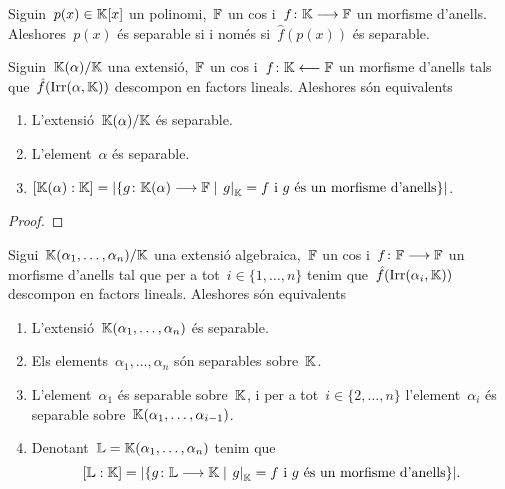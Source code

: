 \documentclass[../../Main.tex]{subfiles}
\begin{document}
	\begin{lemma}
		\label{lema:un polinomi és separable si i només si ho és adaptant els coeficients}
		Siguin~\(p(x)\in\mathbb{K}[x]\) un polinomi,~\(\mathbb{F}\) un cos i~\(f\colon\mathbb{K}\longrightarrow\mathbb{F}\) un morfisme d'anells. Aleshores~\(p(x)\) és separable si i només si~\(\hat{f}(p(x))\) és separable.	
	\end{lemma}
	\begin{lemma}
		\label{lema:condicions pel nombre d'extensions de morfismes}
		Siguin~\(\mathbb{K}(\alpha)/\mathbb{K}\) una extensió,~\(\mathbb{F}\) un cos i~\(f\colon\mathbb{K}\longleftarrow\mathbb{F}\) un morfisme d'anells tals que~\(\hat{f}(\operatorname{Irr}(\alpha,\mathbb{K}))\) descompon en factors lineals. Aleshores són equivalents
		\begin{enumerate}
			\item\label{lema:condicions pel nombre d'extensions de morfismes:eq1} L'extensió~\(\mathbb{K}(\alpha)/\mathbb{K}\) és separable.
			\item\label{lema:condicions pel nombre d'extensions de morfismes:eq2} L'element~\(\alpha\) és separable.
			\item\label{lema:condicions pel nombre d'extensions de morfismes:eq3} \(\grauExtensio{\KK(\alpha)}{\KK}=\card{\{g\colon\KK(\alpha)\longrightarrow\FF\mid\left.g\right|_{\KK}=f\text{ i }g\text{ és un morfisme d'anells}\}}\).
		\end{enumerate}
		\begin{proof}
		\end{proof}
	\end{lemma}
	\begin{theorem}
		\label{thm:Teorema de separabilitat}
		Sigui~\(\mathbb{K}(\alpha_{1},\dots,\alpha_{n})/\mathbb{K}\) una extensió algebraica,~\(\mathbb{F}\) un cos i~\(f\colon\mathbb{F}\longrightarrow\mathbb{F}\) un morfisme d'anells tal que per a tot~\(i\in\{1,\dots,n\}\) tenim que~\(\hat{f}(\operatorname{Irr}(\alpha_{i},\mathbb{K}))\) descompon en factors lineals. Aleshores són equivalents
		\begin{enumerate}
			\item L'extensió~\(\mathbb{K}(\alpha_{1},\dots,\alpha_{n})\) és separable.
			\item Els elements~\(\alpha_{1},\dots,\alpha_{n}\) són separables sobre~\(\mathbb{K}\).
			\item L'element~\(\alpha_{1}\) és separable sobre~\(\mathbb{K}\), i per a tot~\(i\in\{2,\dots,n\}\) l'element~\(\alpha_{i}\) és separable sobre~\(\mathbb{K}(\alpha_{1},\dots,\alpha_{i-1})\).
				\item Denotant~\(\mathbb{L}=\mathbb{K}(\alpha_{1},\dots,\alpha_{n})\) tenim que
				\[
				    \grauExtensio{\LL}{\KK}=\card{\{g\colon\LL\longrightarrow\KK\mid\left.g\right|_{\KK}=f\text{ i }g\text{ és un morfisme d'anells}\}}.
				\]
		\end{enumerate}
	\end{theorem}
\end{document}
